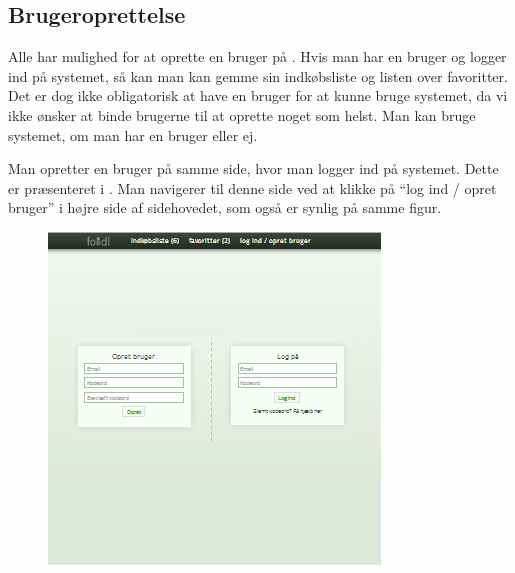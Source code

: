 \subsection{Brugeroprettelse}
\label{subsec:brug-opret}

Alle har mulighed for at oprette en bruger på \Foodl{}. Hvis man har en bruger og logger ind på systemet, så kan man kan gemme sin indkøbsliste og listen over favoritter. Det er dog ikke obligatorisk at have en bruger for at kunne bruge systemet, da vi ikke ønsker at binde brugerne til at oprette noget som helst. Man kan bruge systemet, om man har en bruger eller ej. 

Man opretter en bruger på samme side, hvor man logger ind på systemet. Dette er præsenteret i . Man navigerer til denne side ved at klikke på ``log ind / opret bruger'' i højre side af sidehovedet, som også er synlig på samme figur.

\begin{figure}[H]
	\centering
	\includegraphics[scale=1]{billeder/foodl/thumbnails/opretbrugeroglogind.png}
	\label{fig:overblik-brugeroprettelse}
\end{figure}




